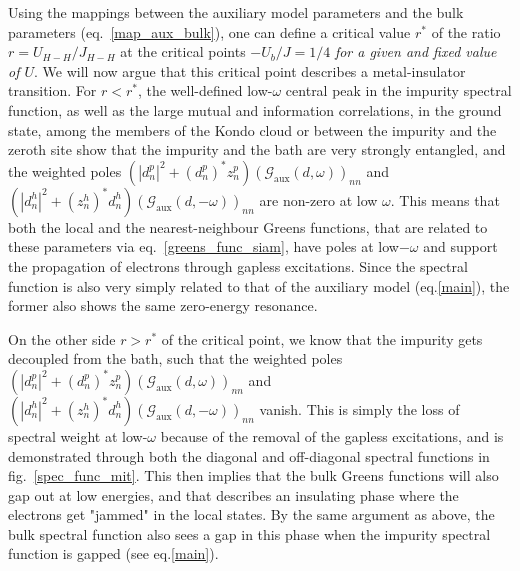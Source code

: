 \documentclass{report}
\numberwithin{equation}{section}
\begin{document}
\begin{itemize}
Using the mappings between the auxiliary model parameters and the bulk parameters (eq.~\ref{map_aux_bulk}), one can define a critical value \(r^{*}\) of the ratio \(r = U_{H-H}/J_{H-H}\) at the critical points \(-U_b/J=1/4\) \textit{for a given and fixed value of \(U\)}. We will now argue that this critical point describes a metal-insulator transition. For \(r < r^{*}\), the well-defined low-\(\omega\) central peak in the impurity spectral function, as well as the large mutual and information correlations, in the ground state, among the members of the Kondo cloud or between the impurity and the zeroth site show that the impurity and the bath are very strongly entangled, and the weighted poles \(\left(|d^p_n|^2 + \left(d^p_n\right)^* z^p_n\right) \left(\mathcal{G}_\text{aux}(d, \omega)\right)_{nn}\) and \(\left(|d^h_n|^2 + \left(z^h_n\right)^* d^h_n\right)\left(\mathcal{G}_\text{aux}(d, -\omega)\right)_{nn}\) are non-zero at low \(\omega\). This means that both the local and the nearest-neighbour Greens functions, that are related to these parameters via eq.~\ref{greens_func_siam}, have poles at low\(-\omega\) and support the propagation of electrons through gapless excitations. Since the spectral function is also very simply related to that of the auxiliary model (eq.\eqref{main}), the former also shows the same zero-energy resonance.

On the other side \(r > r^{*}\) of the critical point, we know that the impurity gets decoupled from the bath, such that the weighted poles \(\left(|d^p_n|^2 + \left(d^p_n\right)^* z^p_n\right) \left(\mathcal{G}_\text{aux}(d, \omega)\right)_{nn}\) and \(\left(|d^h_n|^2 + \left(z^h_n\right)^* d^h_n\right)\left(\mathcal{G}_\text{aux}(d, -\omega)\right)_{nn}\) vanish. This is simply the loss of spectral weight at low-\(\omega\) because of the removal of the gapless excitations, and is demonstrated through both the diagonal and off-diagonal spectral functions in fig.~\ref{spec_func_mit}. This then implies that the bulk Greens functions will also gap out at low energies, and that describes an insulating phase where the electrons get "jammed" in the local states. By the same argument as above, the bulk spectral function also sees a gap in this phase when the impurity spectral function is gapped (see eq.\eqref{main}).


\end{itemize}
\end{document}
